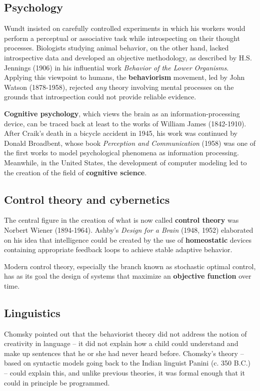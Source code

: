 \documentclass[a4paper,10pt,twoside]{book}
\begin{document}
\subsection{Psychology}

Wundt insisted on carefully controlled experiments in which his workers would perform a perceptual or associative task while introspecting on their thought processes. Biologists studying animal behavior, on the other hand, lacked introspective data and developed an objective methodology, as described by H.S. Jennings (1906) in his influential work \textit{Behavior of the Lower Organisms}. Applying this viewpoint to humans, the \textbf{behaviorism} movement, led by John Watson (1878-1958), rejected \textit{any} theory involving mental processes on the grounds that introspection could not provide reliable evidence.

\textbf{Cognitive psychology}, which views the brain as an information-processing device, can be traced back at least to the works of William James (1842-1910). After Craik's death in a bicycle accident in 1945, his work was continued by Donald Broadbent, whose book \textit{Perception and Communication} (1958) was one of the first works to model psychological phenomena as information processing. Meanwhile, in the United States, the development of computer modeling led to the creation of the field of \textbf{cognitive science}.

\subsection{Control theory and cybernetics}

The central figure in the creation of what is now called \textbf{control theory} was Norbert Wiener (1894-1964). Ashby's \textit{Design for a Brain} (1948, 1952) elaborated on his idea that intelligence could be created by the use of \textbf{homeostatic} devices containing appropriate feedback loops to achieve stable adaptive behavior.

Modern control theory, especially the branch known as stochastic optimal control, has as its goal the design of systems that maximize an \textbf{objective function} over time.

\subsection{Linguistics}

Chomsky pointed out that the behaviorist theory did not address the notion of creativity in language -- it did not explain how a child could understand and make up sentences that he or she had never heard before. Chomsky's theory -- based on syntactic models going back to the Indian linguist Panini (c. 350 B.C.) -- could explain this, and unlike previous theories, it was formal enough that it could in principle be programmed. 
\end{document}
